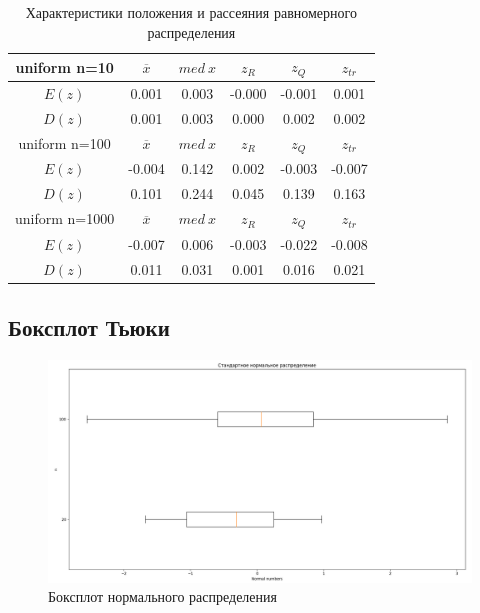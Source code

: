 \begin{table}[H]
	\begin{center}
		\begin{tabular}{|c||c|c|c|c|c|}
			\hline
			uniform n=10 & $\overline{x} $ & $med\:x$ & $z_{R}$ & $z_{Q}$ & $z_{tr}$ \\
			\hline\hline
			$E(z)$ & 0.001 & 0.003 & -0.000 & -0.001 & 0.001 \\
			\hline
			$D(z)$ & 0.001 & 0.003 & 0.000 & 0.002 & 0.002 \\
			\hline\hline
			uniform n=100 & $\overline{x} $ & $med\:x$ & $z_{R}$ & $z_{Q}$ & $z_{tr}$ \\
			\hline\hline
			$E(z)$ & -0.004 & 0.142 & 0.002 & -0.003 & -0.007 \\
			\hline
			$D(z)$ & 0.101 & 0.244 & 0.045 & 0.139 & 0.163 \\
			\hline\hline
			uniform n=1000 & $\overline{x} $ & $med\:x$ & $z_{R}$ & $z_{Q}$ & $z_{tr}$ \\
			\hline\hline
			$E(z)$ & -0.007 & 0.006 & -0.003 & -0.022 & -0.008 \\
			\hline
			$D(z)$ & 0.011 & 0.031 & 0.001 & 0.016 & 0.021 \\
			\hline
		\end{tabular}
	\end{center}
	\caption{Характеристики положения и рассеяния равномерного распределения}
\end{table}

\subsection{Боксплот Тьюки}

\begin{figure}[H]
	\centering
	\includegraphics[scale=0.3]{resources/3_gauss.png}
	\caption{Боксплот нормального распределения}
\end{figure}

